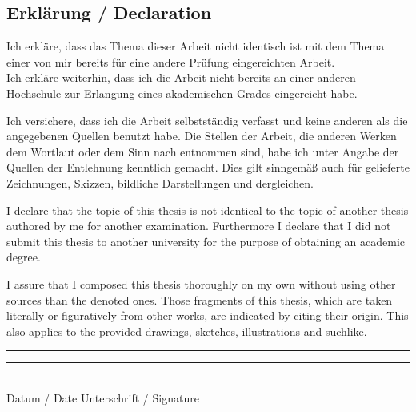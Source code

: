 \documentclass[11pt, a4paper]{article}
\begin{document}
\newpage

\listoffigures


\listoftables

\newpage

{}


\newpage

\thispagestyle{empty}

\begin{center}
\subsection*{Erklärung / Declaration}
\end{center}
\vspace{0.5cm}
Ich erkläre, dass das Thema dieser Arbeit nicht identisch ist mit dem Thema einer von mir bereits für eine andere Prüfung eingereichten Arbeit.\\
Ich erkläre weiterhin, dass ich die Arbeit nicht bereits an einer anderen Hochschule zur Erlangung eines akademischen Grades eingereicht habe.

\vspace{0.8cm}
Ich versichere, dass ich die Arbeit selbstständig verfasst und keine anderen als die angegebenen Quellen benutzt habe. Die Stellen der Arbeit, die anderen Werken dem Wortlaut oder dem Sinn nach entnommen sind, habe ich unter Angabe der Quellen der Entlehnung kenntlich gemacht. Dies gilt sinngemäß auch für gelieferte Zeichnungen, Skizzen, bildliche Darstellungen und dergleichen.

\vspace{2cm}
I declare that the topic of this thesis is not identical to the topic of another thesis authored by me for another examination. Furthermore I declare that I did not submit this thesis to another university for the purpose of obtaining an academic degree.

\vspace{0.8cm}
I assure that I composed this thesis thoroughly on my own without using other sources than the denoted ones. Those fragments of this thesis, which are taken literally or figuratively from other works, are indicated by citing their origin. This also applies to the provided drawings, sketches, illustrations and suchlike.

\vspace{1.5cm}
\rule[0.05cm]{5cm}{0.5pt} \hspace{4.5cm} \rule[0.05cm]{5cm}{0.5pt}\\
Datum / Date \hspace{7.1cm} Unterschrift / Signature
\end{document}

